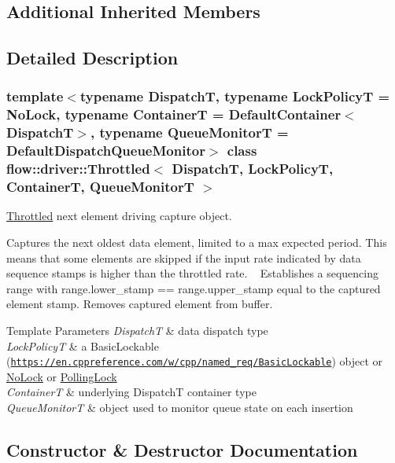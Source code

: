 \subsection*{Additional Inherited Members}


\subsection{Detailed Description}
\subsubsection*{template$<$typename DispatchT, typename Lock\+PolicyT = No\+Lock, typename ContainerT = Default\+Container$<$\+Dispatch\+T$>$, typename Queue\+MonitorT = Default\+Dispatch\+Queue\+Monitor$>$\newline
class flow\+::driver\+::\+Throttled$<$ Dispatch\+T, Lock\+Policy\+T, Container\+T, Queue\+Monitor\+T $>$}

\hyperlink{classflow_1_1driver_1_1_throttled}{Throttled} next element driving capture object. 

Captures the next oldest data element, limited to a max expected period. This means that some elements are skipped if the input rate indicated by data sequence stamps is higher than the throttled rate. ~\newline
 Establishes a sequencing range with {\ttfamily range.\+lower\+\_\+stamp == range.\+upper\+\_\+stamp} equal to the captured element stamp. Removes captured element from buffer.


\begin{DoxyTemplParams}{Template Parameters}
{\em DispatchT} & data dispatch type \\
\hline
{\em Lock\+PolicyT} & a Basic\+Lockable (\href{https://en.cppreference.com/w/cpp/named_req/BasicLockable}{\tt https\+://en.\+cppreference.\+com/w/cpp/named\+\_\+req/\+Basic\+Lockable}) object or \hyperlink{structflow_1_1_no_lock}{No\+Lock} or \hyperlink{structflow_1_1_polling_lock}{Polling\+Lock} \\
\hline
{\em ContainerT} & underlying {\ttfamily DispatchT} container type \\
\hline
{\em Queue\+MonitorT} & object used to monitor queue state on each insertion \\
\hline
\end{DoxyTemplParams}


\subsection{Constructor \& Destructor Documentation}
\mbox{\label{classflow_1_1driver_1_1_throttled_a745fa3afaa8aa8ffdf6f5b6efa49a4e2}} 
